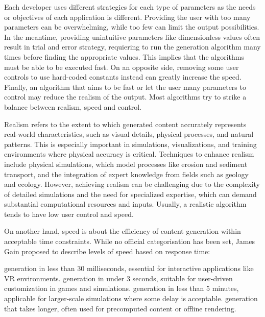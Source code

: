 Each developer uses different strategies for each type of parameters as the needs or objectives of each application is different. Providing the user with too many parameters can be overwhelming, while too few can limit the output possibilities. In the meantime, providing unintuitive parameters like dimensionless values often result in trial and error strategy, requiering to run the generation algorithm many times before finding the appropriate values. This implies that the algorithms must be able to be executed fast. On an opposite side, removing some user controls to use hard-coded constants instead can greatly increase the speed. Finally, an algorithm that aims to be fast or let the user many parameters to control may reduce the realism of the output. Most algorithms try to strike a balance between realism, speed and control.


Realism refers to the extent to which generated content accurately represents real-world characteristics, such as visual details, physical processes, and natural patterns. This is especially important in simulations, visualizations, and training environments where physical accuracy is critical. Techniques to enhance realism include physical simulations, which model processes like erosion and sediment transport, and the integration of expert knowledge from fields such as geology and ecology. However, achieving realism can be challenging due to the complexity of detailed simulations and the need for specialized expertise, which can demand substantial computational resources and inputs. Usually, a realistic algorithm tends to have low user control and speed.

On another hand, speed is about the efficiency of content generation within acceptable time constraints. While no official categorisation has been set, James Gain proposed to describe levels of speed based on response time:
\begin{Itemize}
     generation in less than 30 milliseconds, essential for interactive applications like VR environments. 
     generation in under 3 seconds, suitable for user-driven customization in games and simulations. 
     generation in less than 5 minutes, applicable for larger-scale simulations where some delay is acceptable. 
     generation that takes longer, often used for precomputed content or offline rendering.
\end{Itemize}

